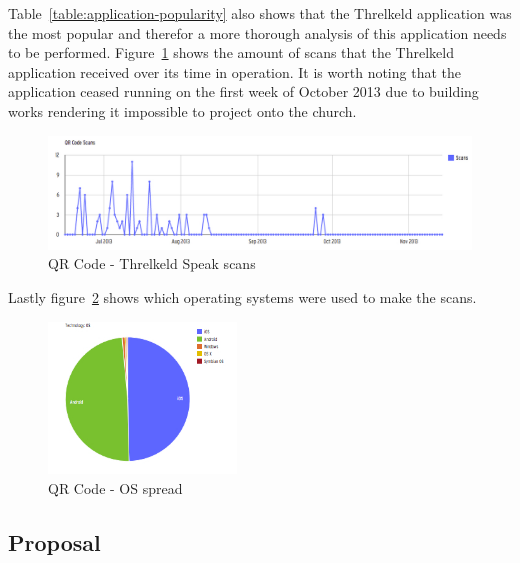 \documentclass[a4paper,12pt]{article}
\begin{document}
\par
Table~\ref{table:application-popularity} also shows that the Threlkeld application was the most popular and therefor a more thorough analysis of this application needs to be performed. Figure~\ref{QR-threkeld} shows the amount of scans that the Threlkeld application received over its time in operation. 
It is worth noting that the application ceased running on the first week of October 2013 due to building works rendering it impossible to project onto the church.

\begin{figure}[ht!]
	\centering
	\includegraphics[width=150mm]{./images/threkeld-scans}
	\caption{QR Code - Threlkeld Speak scans}
	\label{QR-threkeld}
\end{figure}

\par
Lastly figure~\ref{QR-OS-access} shows which operating systems were used to make the scans.
\begin{figure}[ht!]
	\centering
	\includegraphics[width=50mm]{./images/OSAccess}
	\caption{QR Code - OS spread}
	\label{QR-OS-access}
\end{figure}





\newpage
\subsection{Proposal}
\end{document}
